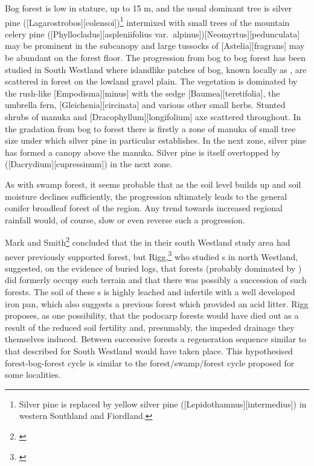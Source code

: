 Bog forest is low in stature, up to 15 m, and the usual dominant tree is silver pine ([Lagarostrobos][colensoi])\footnote{Silver pine is replaced by yellow silver pine ([Lepidothamnus][intermedius]) in western Southland and Fiordland.} intermixed with small trees of the mountain celery pine ([Phyllocladus][aspleniifolius var.\ alpinus])[Neomyrtus][pedunculata] may be prominent in the subcanopy and large tussocks of [Astelia][fragrans] may be abundant on the forest floor.
The progression from bog to bog forest has been studied in South Westland where islandlike patches of bog, known locally as , are scattered in forest on the lowland gravel plain.
The  vegetation is dominated by the rush-like [Empodisma][minus] with the sedge [Baumea][teretifolia], the umbrella fern, [Gleichenia][circinata] and various other small herbs.
Stunted shrubs of manuka and [Dracophyllum][longifolium] axe scattered throughout.
In the gradation from bog to forest there is firstly a zone of manuka of small tree size under which silver pine in particular establishes.
In the next zone, silver pine has formed a canopy above the manuka.
Silver pine is itself overtopped by  ([Dacrydium][cupressinum]) in the next zone.

As with  swamp forest, it seems probable that as the soil level builds up and soil moisture declines sufficiently, the progression ultimately leads to the general conifer broadleaf forest of the region.
Any trend towards increased regional rainfall would, of course, slow or even reverse such a progression.

Mark and Smith\footnote{\cite{mark1975lowland}} concluded that the  in their south Westland study area had never previously supported forest, but Rigg,\footnote{\cite{rigg1962pakihi}} who studied s in north Westland, suggested, on the evidence of buried logs, that forests (probably dominated by ) did formerly occupy such terrain and that there was possibly a succession of such forests.
The soil of these s is highly leached and infertile with a well developed iron pan, which also suggests a previous forest which provided an acid litter.
Rigg proposes, as one possibility, that the podocarp forests would have died out as a result of the reduced soil fertility and, presumably, the impeded drainage they themselves induced.
Between successive forests a regeneration sequence similar to that described for South Westland would have taken place.
This hypothesised forest-bog-forest cycle is similar to the forest/swamp/forest cycle proposed for some  localities.

